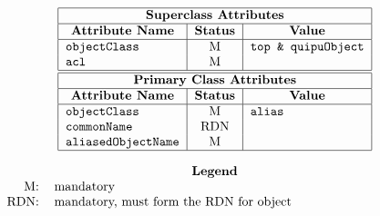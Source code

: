 
\smaller

\[\begin{tabular}{|l|c|l|}
\hline
\multicolumn{3}{|c|}{\bf Superclass Attributes}\\
\hline
\multicolumn{1}{|c|}{\bf Attribute Name}&
			\multicolumn{1}{c|}{\bf Status}&
				\multicolumn{1}{c|}{\bf Value}\\
\hline
\verb"objectClass"&	M&	\verb"top & quipuObject"\\
\verb"acl"&		M&	\\
\hline
\hline
\multicolumn{3}{|c|}{\bf Primary Class Attributes}\\
\hline
\multicolumn{1}{|c|}{\bf Attribute Name}&
			\multicolumn{1}{c|}{\bf Status}&
				\multicolumn{1}{c|}{\bf Value}\\
\hline
\verb"objectClass"&	M&	\verb"alias"\\
\verb"commonName"&	RDN&	\\
\verb"aliasedObjectName"&
			M&	\\
\hline
\end{tabular}\]

\[\begin{tabular}{rp{4in}}
\multicolumn{2}{c}{\bf Legend}\\
M:&	mandatory\\
RDN:&	mandatory, must form the RDN for object
\end{tabular}\]
